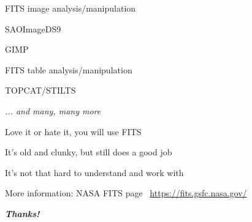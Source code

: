 \documentclass[20pt,landscape]{foils}
\newif\ifrubric
\newcommand{\burl}[1]{{\color{blue}\url{#1}}}
\begin{document}
\begin{list1}
  \item FITS image analysis/manipulation
\vspace*{-0.2cm}
  \begin{list2}
\vspace*{-0.1cm}
    \item SAOImageDS9
\vspace*{-0.1cm}
    \item GIMP
  \end{list2}
\vspace*{-0.2cm}
  \item FITS table analysis/manipulation
\vspace*{-0.2cm}
  \begin{list2}
\vspace*{-0.1cm}
    \item TOPCAT/STILTS
  \end{list2}
\vspace*{-0.2cm}
  \item[] \hspace*{8cm} {\color{darkgrey}\sl ... and many, many more}
\end{list1}


\begin{list1}
  \item Love it or hate it, you will use FITS
  \item It's old and clunky, but still does a good job
  \item It's not that hard to understand and work with
  \item More information: NASA FITS page \ \burl{https://fits.gsfc.nasa.gov/}
\end{list1}

\vspace{6cm}
\begin{center}
  {\color{darkred}\Huge\bf\sl Thanks!}
\end{center}

\label{lastPage}

\ifrubric
\end{document}
